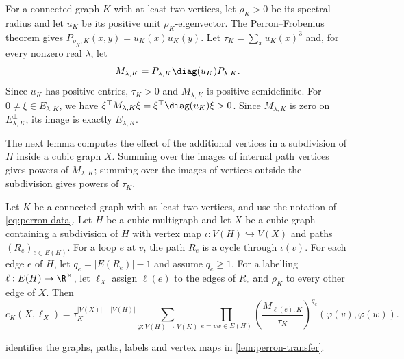 For a connected graph $K$ with at least two vertices, let $\rho_K>0$ be its spectral
radius and let $u_K$ be its positive unit $\rho_K$-eigenvector.
The Perron--Frobenius theorem gives
$P_{\rho_K,K}(x,y)=u_K(x)u_K(y)$.
Let $\tau_K=\sum_xu_K(x)^3$ and, for every nonzero real $\lambda$, let
\begin{equation}\label{eq:perron-data}
 M_{\lambda,K}=P_{\lambda,K}\diag(u_K)P_{\lambda,K}.
\end{equation}
Since $u_K$ has positive entries, $\tau_K>0$ and $M_{\lambda,K}$ is
positive semidefinite. For $0\ne\xi\in E_{\lambda,K}$, we have
$\xi^\top M_{\lambda,K}\xi=\xi^\top\diag(u_K)\xi>0$.
Since $M_{\lambda,K}$ is zero on $E_{\lambda,K}^{\perp}$, its image
is exactly $E_{\lambda,K}$.

The next lemma computes the effect of the additional vertices in a
subdivision of $H$ inside a cubic graph $X$.
Summing over the images of internal path vertices gives powers of $M_{\lambda,K}$;
summing over the images of vertices outside the subdivision gives powers of $\tau_K$.
\begin{lemma}\label{lem:perron-transfer}
 Let $K$ be a connected graph with at least two vertices, and use the notation of
 \cref{eq:perron-data}. Let $H$ be a cubic multigraph and let $X$ be a
 cubic graph containing a subdivision of $H$ with vertex map
 $\iota:V(H)\hookrightarrow V(X)$ and paths $(R_e)_{e\in E(H)}$.
 For a loop $e$ at $v$, the path $R_e$ is a cycle through $\iota(v)$.
 For each edge $e$ of $H$, let $q_e=|E(R_e)|-1$ and assume $q_e\geq1$.
 For a labelling $\ell:E(H)\to\R^\times$, let $\ell_X$ assign
 $\ell(e)$ to the edges of $R_e$ and $\rho_K$ to every other edge of $X$.
 Then
 \begin{equation}\label{eq:perron-transfer}
  c_K(X,\ell_X)=\tau_K^{|V(X)|-|V(H)|}
    \sum_{\varphi:V(H)\to V(K)}
    \prod_{e=vw\in E(H)}
      \left(\frac{M_{\ell(e),K}}{\tau_K}\right)^{q_e}(\varphi(v),\varphi(w)).
 \end{equation}
\end{lemma}
\noindent{} identifies the graphs, paths, labels and vertex maps
in \cref{lem:perron-transfer}.

